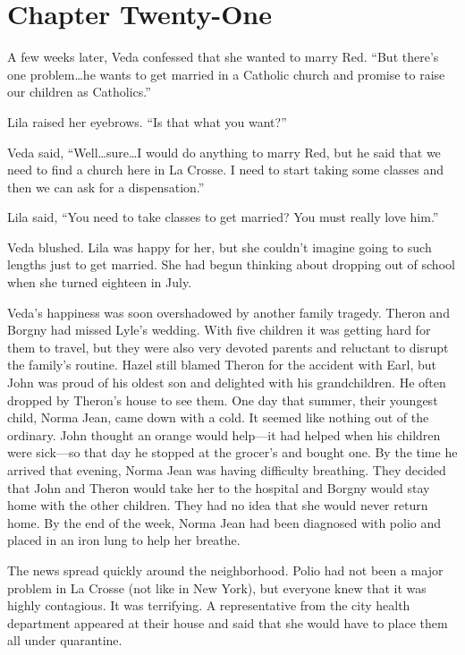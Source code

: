 \documentclass[
  american,
  letterpaper,
]{book}
\begin{document}

\chapter{Chapter Twenty-One}\label{chapter-twenty-one}

A few weeks later, Veda confessed that she wanted to marry Red. ``But
there's one problem\ldots he wants to get married in a Catholic church
and promise to raise our children as Catholics.''

Lila raised her eyebrows. ``Is that what you want?''

Veda said, ``Well\ldots sure\ldots I would do anything to marry Red, but
he said that we need to find a church here in La Crosse. I need to start
taking some classes and then we can ask for a dispensation.''

Lila said, ``You need to take classes to get married? You must really
love him.''

Veda blushed. Lila was happy for her, but she couldn't imagine going to
such lengths just to get married. She had begun thinking about dropping
out of school when she turned eighteen in July.

Veda's happiness was soon overshadowed by another family tragedy. Theron
and Borgny had missed Lyle's wedding. With five children it was getting
hard for them to travel, but they were also very devoted parents and
reluctant to disrupt the family's routine. Hazel still blamed Theron for
the accident with Earl, but John was proud of his oldest son and
delighted with his grandchildren. He often dropped by Theron's house to
see them. One day that summer, their youngest child, Norma Jean, came
down with a cold. It seemed like nothing out of the ordinary. John
thought an orange would help---it had helped when his children were
sick---so that day he stopped at the grocer's and bought one. By the
time he arrived that evening, Norma Jean was having difficulty
breathing. They decided that John and Theron would take her to the
hospital and Borgny would stay home with the other children. They had no
idea that she would never return home. By the end of the week, Norma
Jean had been diagnosed with polio and placed in an iron lung to help
her breathe.

The news spread quickly around the neighborhood. Polio had not been a
major problem in La Crosse (not like in New York), but everyone knew
that it was highly contagious. It was terrifying. A representative from
the city health department appeared at their house and said that she
would have to place them all under quarantine.
\end{document}
